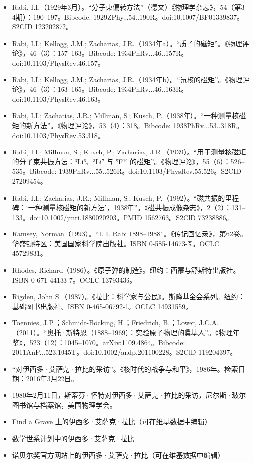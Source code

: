 \begin{itemize}
\item Rabi, I.I.（1929年3月）。“分子束偏转方法”（德文）《物理学杂志》，54（第3–4期）：190–197。Bibcode: 1929ZPhy...54..190R。doi:10.1007/BF01339837。S2CID 123202872。
\item Rabi, I.I.; Kellogg, J.M.; Zacharias, J.R.（1934年a）。“质子的磁矩”。《物理评论》，46（3）：157–163。Bibcode: 1934PhRv...46..157R。doi:10.1103/PhysRev.46.157。
\item Rabi, I.I.; Kellogg, J.M.; Zacharias, J.R.（1934年b）。“氘核的磁矩”。《物理评论》，46（3）：163–165。Bibcode: 1934PhRv...46..163R。doi:10.1103/PhysRev.46.163。
\item Rabi, I.I.; Zacharias, J.R.; Millman, S.; Kusch, P.（1938年）。“一种测量核磁矩的新方法”。《物理评论》，53（4）：318。Bibcode: 1938PhRv...53..318R。doi:10.1103/PhysRev.53.318。
\item Rabi, I.I.; Millman, S.; Kusch, P.; Zacharias, J.R.（1939）。“用于测量核磁矩的分子束共振方法：³Li⁶、³Li⁷ 与 ⁹F¹⁹ 的磁矩”。《物理评论》，55（6）：526–535。Bibcode: 1939PhRv...55..526R。doi:10.1103/PhysRev.55.526。S2CID 27209454。
\item Rabi, I.I.; Zacharias, J.R.; Millman, S.; Kusch, P.（1992）。“磁共振的里程碑：‘一种测量核磁矩的新方法’，1938年”。《磁共振成像杂志》，2（2）：131–133。doi:10.1002/jmri.1880020203。PMID 1562763。S2CID 73238886。
\item Ramsey, Norman（1993）。“I. I. Rabi 1898–1988”。《传记回忆录》，第62卷。华盛顿特区：美国国家科学院出版社。ISBN 0-585-14673-X。OCLC 45729831。
\item Rhodes, Richard（1986）。《原子弹的制造》。纽约：西蒙与舒斯特出版社。ISBN 0-671-44133-7。OCLC 13793436。
\item Rigden, John S.（1987）。《拉比：科学家与公民》。斯隆基金会系列。纽约：基础图书出版社。ISBN 0-465-06792-1。OCLC 14931559。
\item Toennies, J.P.；Schmidt-Böcking, H.；Friedrich, B.；Lower, J.C.A.（2011）。“奥托·斯特恩（1888–1969）：实验原子物理的奠基人”。《物理年鉴》，523（12）：1045–1070。arXiv:1109.4864。Bibcode: 2011AnP...523.1045T。doi:10.1002/andp.201100228。S2CID 119204397。
\item “对伊西多·艾萨克·拉比的采访”。《核时代的战争与和平》，1986年。检索日期：2016年3月22日。
\item 1980年2月11日，斯蒂芬·怀特对伊西多·艾萨克·拉比的采访，尼尔斯·玻尔图书馆与档案馆，美国物理学会。
\item Find a Grave 上的伊西多·艾萨克·拉比（可在维基数据中编辑）
\item 数学世系计划中的伊西多·艾萨克·拉比
\item 诺贝尔奖官方网站上的伊西多·艾萨克·拉比（可在维基数据中编辑）

\end{itemize}